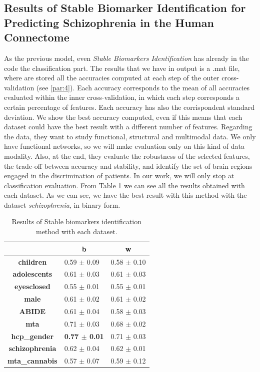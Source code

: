\subsection{Results of Stable Biomarker Identification for Predicting Schizophrenia in the Human Connectome}

As the previous model, even \textit{Stable Biomarkers Identification} has already in the code the classification part. The results that we have in output is a .mat file, where are stored all the accuracies computed at each step of the outer cross-validation (see \ref{par:4}). Each accuracy corresponds to the mean of all accuracies evaluated within the inner cross-validation, in which each step corresponds a certain percentage of features. Each accuracy has also the corrispondent standard deviation. We show the best accuracy computed, even if this means that each dataset could have the best result with a different number of features. Regarding the data, they want to study functional, structural and multimodal data. We only have functional networks, so we will make evaluation only on this kind of data modality. Also, at the end, they evaluate the robustness of the selected features, the trade-off between accuracy and stability, and identify the set of brain regions engaged in the discrimination of patients. In our work, we will only stop at classification evaluation. From Table \ref{tab:biomarkers} we can see all the results obtained with each dataset. As we can see, we have the best result with this method with the dataset \textit{schizophrenia}, in binary form.
\vspace{0.5cm}

\begin{table}
	\centering
	\begin{tabular}{c|l|c} 
		\toprule
		& \multicolumn{1}{c|}{b} & w                \\ 
		\midrule
		\textbf{children}      & 0.59 $\pm$ 0.09        & 0.58 $\pm$ 0.10  \\
		\textbf{adolescents}   & 0.61 $\pm$ 0.03        & 0.61 $\pm$ 0.03  \\
		\textbf{eyesclosed}    & 0.55 $\pm$ 0.01        & 0.55 $\pm$ 0.01  \\
		\textbf{male}          & 0.61 $\pm$ 0.02        & 0.61 $\pm$ 0.02  \\
		\textbf{ABIDE}         & 0.61 $\pm$ 0.04        & 0.58 $\pm$ 0.03  \\
		\textbf{mta}           & 0.71 $\pm$ 0.03        & 0.68 $\pm$ 0.02  \\
		\textbf{hcp\_gender}   & \textbf{0.77 $\pm$ 0.01}        & 0.71 $\pm$ 0.03  \\
		\textbf{schizophrenia} & 0.62 $\pm$ 0.04        & 0.62 $\pm$ 0.01  \\
		\textbf{mta\_cannabis} & 0.57 $\pm$ 0.07        & 0.59 $\pm$ 0.12 
	\end{tabular}
\caption{Results of Stable biomarkers identification method with each dataset.}
\label{tab:biomarkers}
\end{table}


